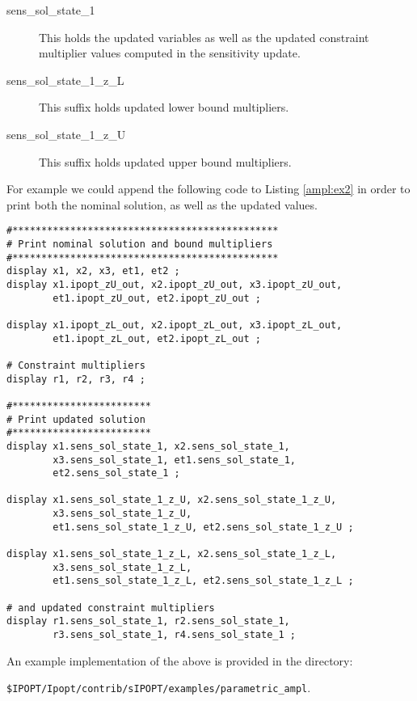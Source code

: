 \documentclass[letter, 11pt]{article}
\newcommand{\AMPL}{AMPL}
\newcommand{\ipoptf}{\$IPOPT}
\newcommand{\sensdir}{sIPOPT}
\newcommand{\sstateo}{sens\_sol\_state\_1}
\newcommand{\sstatezl}{sens\_sol\_state\_1\_z\_L}
\newcommand{\sstatezu}{sens\_sol\_state\_1\_z\_U}
\begin{document}
\begin{description}
\item[\sstateo]  This holds the updated variables as well as the updated constraint multiplier
                 values computed in the sensitivity update.
\item[\sstatezl] This suffix holds updated lower bound multipliers.
\item[\sstatezu] This suffix holds updated upper bound multipliers.
\end{description}

For example we could append the following code to Listing \ref{ampl:ex2} in order to print both the nominal
solution, as well as the updated values.

%
\begin{lstlisting}[language=ampl, frame=single, captionpos=b,caption={\AMPL\ code to print updated solution.}, label={ampl:ex3}]
#**********************************************
# Print nominal solution and bound multipliers
#**********************************************
display x1, x2, x3, et1, et2 ;
display x1.ipopt_zU_out, x2.ipopt_zU_out, x3.ipopt_zU_out,
        et1.ipopt_zU_out, et2.ipopt_zU_out ;

display x1.ipopt_zL_out, x2.ipopt_zL_out, x3.ipopt_zL_out,
        et1.ipopt_zL_out, et2.ipopt_zL_out ;

# Constraint multipliers
display r1, r2, r3, r4 ;

#************************
# Print updated solution
#************************
display x1.sens_sol_state_1, x2.sens_sol_state_1,
        x3.sens_sol_state_1, et1.sens_sol_state_1,
        et2.sens_sol_state_1 ;

display x1.sens_sol_state_1_z_U, x2.sens_sol_state_1_z_U,
        x3.sens_sol_state_1_z_U,
        et1.sens_sol_state_1_z_U, et2.sens_sol_state_1_z_U ;

display x1.sens_sol_state_1_z_L, x2.sens_sol_state_1_z_L,
        x3.sens_sol_state_1_z_L,
        et1.sens_sol_state_1_z_L, et2.sens_sol_state_1_z_L ;

# and updated constraint multipliers
display r1.sens_sol_state_1, r2.sens_sol_state_1,
        r3.sens_sol_state_1, r4.sens_sol_state_1 ;
\end{lstlisting}


An example implementation of the above is provided in the directory:

\begin{description}
\item {\tt \ipoptf/Ipopt/contrib/\sensdir/examples/parametric\_ampl}.
\end{description}
\end{document}
